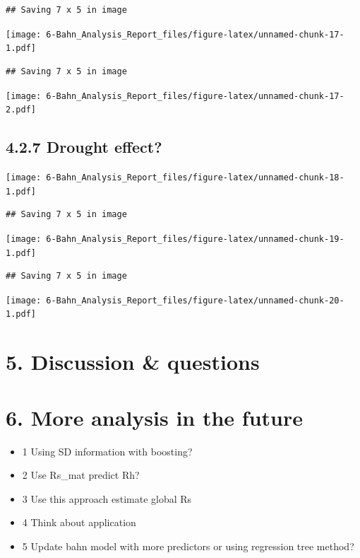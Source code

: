 \documentclass[]{article}
\providecommand{\tightlist}{%
  \setlength{\itemsep}{0pt}\setlength{\parskip}{0pt}}
\begin{document}
\begin{verbatim}
## Saving 7 x 5 in image
\end{verbatim}

\texttt{[image: 6-Bahn\_Analysis\_Report\_files/figure-latex/unnamed-chunk-17-1.pdf]}

\begin{verbatim}
## Saving 7 x 5 in image
\end{verbatim}

\texttt{[image: 6-Bahn\_Analysis\_Report\_files/figure-latex/unnamed-chunk-17-2.pdf]}

\hypertarget{drought-effect}{%
\subsection{4.2.7 Drought effect?}\label{drought-effect}}

\texttt{[image: 6-Bahn\_Analysis\_Report\_files/figure-latex/unnamed-chunk-18-1.pdf]}

\begin{verbatim}
## Saving 7 x 5 in image
\end{verbatim}

\texttt{[image: 6-Bahn\_Analysis\_Report\_files/figure-latex/unnamed-chunk-19-1.pdf]}

\begin{verbatim}
## Saving 7 x 5 in image
\end{verbatim}

\texttt{[image: 6-Bahn\_Analysis\_Report\_files/figure-latex/unnamed-chunk-20-1.pdf]}

\hypertarget{discussion-questions}{%
\section{5. Discussion \& questions}\label{discussion-questions}}

\hypertarget{more-analysis-in-the-future}{%
\section{6. More analysis in the
future}\label{more-analysis-in-the-future}}

\begin{itemize}
\tightlist
\item
  1 Using SD information with boosting?
\item
  2 Use Rs\_mat predict Rh?
\item
  3 Use this approach estimate global Rs
\item
  4 Think about application
\item
  5 Update bahn model with more predictors or using regression tree
  method?
\end{itemize}
\end{document}
